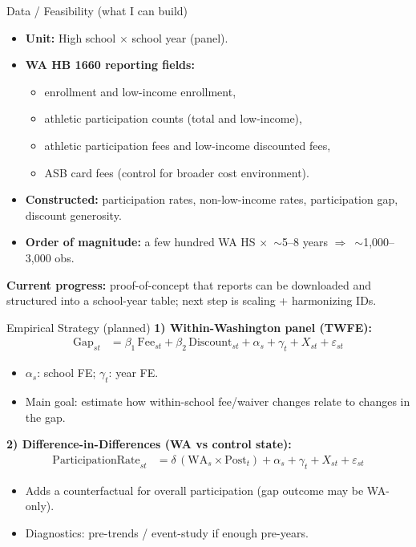 \documentclass[11pt]{beamer}
\begin{document}
\begin{frame}{Data / Feasibility (what I can build)}
\begin{itemize}
  \item \textbf{Unit:} High school $\times$ school year (panel).
  \item \textbf{WA HB 1660 reporting fields:}
    \begin{itemize}
      \item enrollment and low-income enrollment,
      \item athletic participation counts (total and low-income),
      \item athletic participation fees and low-income discounted fees,
      \item ASB card fees (control for broader cost environment).
    \end{itemize}
  \item \textbf{Constructed:} participation rates, non-low-income rates, participation gap, discount generosity.
  \item \textbf{Order of magnitude:} a few hundred WA HS $\times$ \,$\sim$5--8 years $\Rightarrow$ \,$\sim$1{,}000--3{,}000 obs.
\end{itemize}

\vspace{0.5em}
\textbf{Current progress:} proof-of-concept that reports can be downloaded and structured into a school-year table; next step is scaling + harmonizing IDs.
\end{frame}

\begin{frame}{Empirical Strategy (planned)}
\textbf{1) Within-Washington panel (TWFE):}
\begin{align*}
\text{Gap}_{s t} &= \beta_1\,\text{Fee}_{s t} + \beta_2\,\text{Discount}_{s t} + \alpha_s + \gamma_t + X_{s t} + \varepsilon_{s t}
\end{align*}
\begin{itemize}
  \item $\alpha_s$: school FE; $\gamma_t$: year FE.
  \item Main goal: estimate how within-school fee/waiver changes relate to changes in the gap.
\end{itemize}

\vspace{0.5em}
\textbf{2) Difference-in-Differences (WA vs control state):}
\begin{align*}
\text{ParticipationRate}_{s t} &= \delta\,(\text{WA}_s \times \text{Post}_t) + \alpha_s + \gamma_t + X_{s t} + \varepsilon_{s t}
\end{align*}
\begin{itemize}
  \item Adds a counterfactual for overall participation (gap outcome may be WA-only).
  \item Diagnostics: pre-trends / event-study if enough pre-years.
\end{itemize}
\end{frame}
\end{document}
